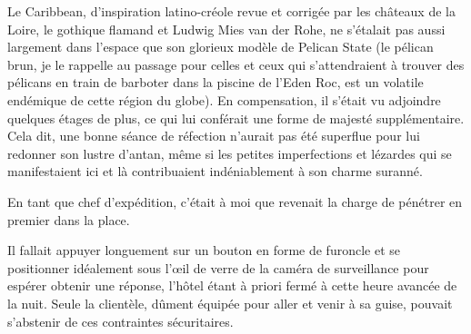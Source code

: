%

Le Caribbean, d’inspiration latino-créole revue et corrigée par les châteaux de la Loire, le gothique flamand et Ludwig Mies van der Rohe, ne s’étalait pas aussi largement dans l’espace que son glorieux modèle de Pelican State (le pélican brun, je le rappelle au passage pour celles et ceux qui s’attendraient à trouver des pélicans en train de barboter dans la piscine de l’Eden Roc, est un volatile endémique de cette région du globe). En compensation, il s’était vu adjoindre quelques étages de plus, ce qui lui conférait une forme de majesté supplémentaire. Cela dit, une bonne séance de réfection n’aurait pas été superflue pour lui redonner son lustre d’antan, même si les petites imperfections et lézardes qui se manifestaient ici et là contribuaient indéniablement à son charme suranné.

%

%

En tant que chef d’expédition, c’était à moi que revenait la charge de pénétrer en premier dans la place.

Il fallait appuyer longuement sur un bouton en forme de furoncle et se positionner idéalement sous l’œil de verre de la caméra de surveillance pour espérer obtenir une réponse, l’hôtel étant à priori fermé à cette heure avancée de la nuit. Seule la clientèle, dûment équipée pour aller et venir à sa guise, pouvait s’abstenir de ces contraintes sécuritaires.

